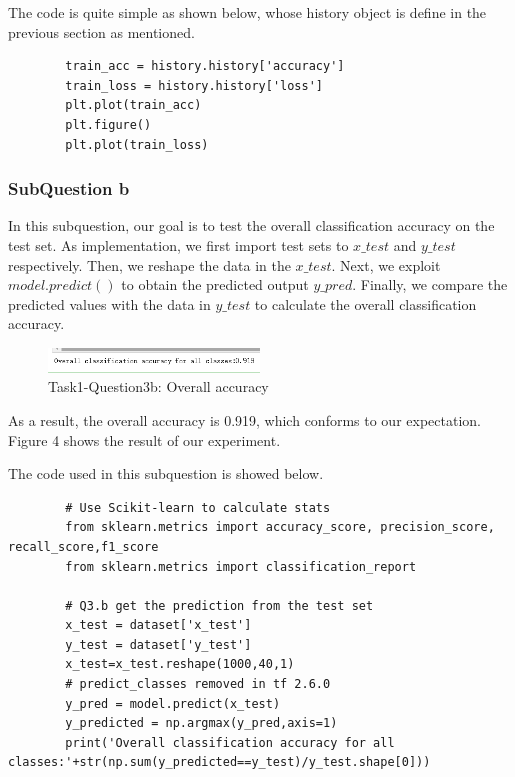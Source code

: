 \documentclass[conference]{IEEEtran}
\begin{document}
	The code is quite simple as shown below, whose history object is define in the previous section as mentioned. 
	
	\begin{lstlisting}
		train_acc = history.history['accuracy']
		train_loss = history.history['loss']
		plt.plot(train_acc)
		plt.figure()
		plt.plot(train_loss)
	\end{lstlisting}
	
	\subsubsection{SubQuestion b}
	In this subquestion, our goal is to test the overall classification accuracy on the test set. As implementation, we first import test sets to $x\_test$ and $y\_test$ respectively. Then, we reshape the data in the $x\_test$. Next, we exploit $model.predict()$ to obtain the predicted output $y\_pred$. Finally, we compare the predicted values with the data in $y\_test$ to calculate the overall classification accuracy.\par
	\begin{figure}[h] 
		\centering
		\includegraphics[width=0.5\textwidth]{T1Q3b.png}
		\caption{Task1-Question3b: Overall accuracy} 
		\label{Fig.t1q3b} 
	\end{figure}
	
	As a result, the overall accuracy is 0.919, which conforms to our expectation. Figure 4 shows the result of our experiment.\par
	
	
	
	The code used in this subquestion is showed below.
	
	\begin{lstlisting}
		# Use Scikit-learn to calculate stats
		from sklearn.metrics import accuracy_score, precision_score, recall_score,f1_score
		from sklearn.metrics import classification_report
		
		# Q3.b get the prediction from the test set
		x_test = dataset['x_test']
		y_test = dataset['y_test']
		x_test=x_test.reshape(1000,40,1)
		# predict_classes removed in tf 2.6.0
		y_pred = model.predict(x_test)
		y_predicted = np.argmax(y_pred,axis=1)
		print('Overall classification accuracy for all classes:'+str(np.sum(y_predicted==y_test)/y_test.shape[0]))
	\end{lstlisting}
	
\end{document}
